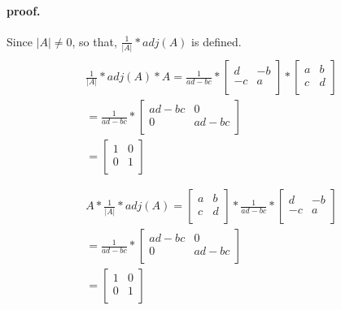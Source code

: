 \documentclass{article}
\begin{document}
	\paragraph{proof.} Since $\lvert A \rvert \neq 0$, so that, $\frac{1}{\lvert A \rvert} * adj(A)$ is defined.
	\begin{multline}
	\\
		\frac{1}{\lvert A \rvert} * adj(A) * A = \frac{1}{ad-bc} * \begin{bmatrix}
		d & -b \\
		-c & a \\
	\end{bmatrix} * 
	\begin{bmatrix}
		a & b \\
		c & d \\
	\end{bmatrix} \\
	= \frac{1}{ad-bc} * 
	\begin{bmatrix}
		ad-bc & 0 \\
		0 & ad-bc\\
	\end{bmatrix} \\
	= \begin{bmatrix}
		1 & 0 \\
		0 & 1 \\
	\end{bmatrix}
	\\
	\end{multline}
	\begin{multline}
		\\
		A * \frac{1}{\lvert A \rvert} * adj(A) = \begin{bmatrix}
		a & b \\
		c & d \\
	\end{bmatrix} * \frac{1}{ad - bc} * \begin{bmatrix}
		d & -b \\
		-c & a \\
	\end{bmatrix} \\
	= \frac{1}{ad-bc} * 
	\begin{bmatrix}
		ad-bc & 0 \\
		0 & ad-bc\\
	\end{bmatrix} \\
	= \begin{bmatrix}
		1 & 0 \\
		0 & 1 \\
	\end{bmatrix}
		\\
	\end{multline}
\end{document}
